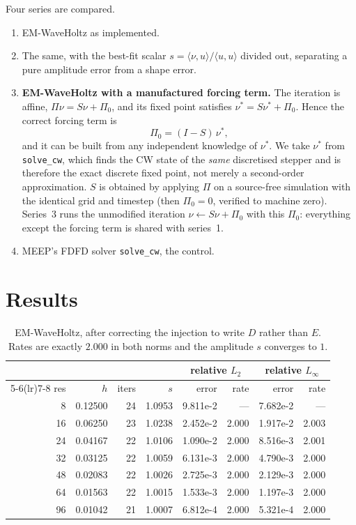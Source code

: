 \documentclass[11pt]{article}
\begin{document}
Four series are compared.
\begin{enumerate}
\item EM-WaveHoltz as implemented.
\item The same, with the best-fit scalar
      $s = \langle\nu,u\rangle/\langle u,u\rangle$ divided out, separating a
      pure amplitude error from a shape error.
\item \textbf{EM-WaveHoltz with a manufactured forcing term.} The iteration is
      affine, $\Pi\nu = S\nu + \Pi_0$, and its fixed point satisfies
      $\nu^\ast = S\nu^\ast + \Pi_0$. Hence the correct forcing term is
      \begin{equation}
        \Pi_0 = (I-S)\,\nu^\ast ,
        \label{eq:pi0}
      \end{equation}
      and it can be built from any independent knowledge of $\nu^\ast$. We take
      $\nu^\ast$ from \texttt{solve\_cw}, which finds the CW state of the
      \emph{same} discretised stepper and is therefore the exact discrete fixed
      point, not merely a second-order approximation. $S$ is obtained by
      applying $\Pi$ on a source-free simulation with the identical grid and
      timestep (then $\Pi_0 = 0$, verified to machine zero). Series~3 runs the
      unmodified iteration $\nu \leftarrow S\nu + \Pi_0$ with this
      $\Pi_0$: everything except the forcing term is shared with series~1.
\item MEEP's FDFD solver \texttt{solve\_cw}, the control.
\end{enumerate}

\section{Results}

\begin{table}[h]
\centering
\small
\begin{tabular}{rrrr rr rr}
\toprule
& & & & \multicolumn{2}{c}{relative $L_2$} & \multicolumn{2}{c}{relative $L_\infty$}\\
\cmidrule(lr){5-6}\cmidrule(lr){7-8}
res & $h$ & iters & $s$ & error & rate & error & rate\\
\midrule
 8 & 0.12500 & 24 & 1.0953 & 9.811e-2 & ---   & 7.682e-2 & ---  \\
16 & 0.06250 & 23 & 1.0238 & 2.452e-2 & 2.000 & 1.917e-2 & 2.003\\
24 & 0.04167 & 22 & 1.0106 & 1.090e-2 & 2.000 & 8.516e-3 & 2.001\\
32 & 0.03125 & 22 & 1.0059 & 6.131e-3 & 2.000 & 4.790e-3 & 2.000\\
48 & 0.02083 & 22 & 1.0026 & 2.725e-3 & 2.000 & 2.129e-3 & 2.000\\
64 & 0.01563 & 22 & 1.0015 & 1.533e-3 & 2.000 & 1.197e-3 & 2.000\\
96 & 0.01042 & 21 & 1.0007 & 6.812e-4 & 2.000 & 5.321e-4 & 2.000\\
\bottomrule
\end{tabular}
\caption{EM-WaveHoltz, after correcting the injection to write $D$ rather than
$E$. Rates are exactly $2.000$ in both norms and the amplitude $s$ converges to
$1$.}
\end{table}
\end{document}
